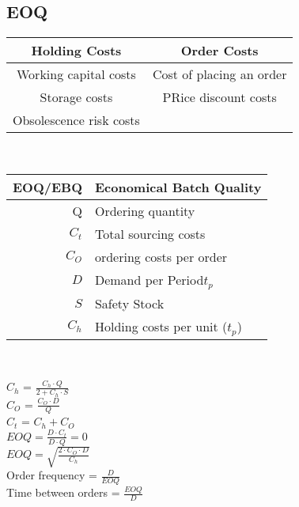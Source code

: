 \subsection{EOQ}
\begin{center}
	\begin{tabular}{|c|c|}
		\hline Holding Costs  & Order Costs \\ 
		\hline Working capital costs & Cost of placing an order \\
		Storage costs & PRice discount costs\\
		Obsolescence risk costs & \\
		\hline
	\end{tabular}
	\\\vspace{5 mm}
	\begin{tabular}{|r|l|}
		\hline EOQ/EBQ  & Economical Batch Quality \\ 
		\hline Q  & Ordering quantity \\ 
		\hline $C_t$ & Total sourcing costs \\ 
		\hline $C_O$ & ordering costs per order\\ 
		\hline $D$ & Demand per Period$t_p$\\
		\hline $S$ & Safety Stock\\
		\hline $C_h$& Holding costs per unit ($t_p$)\\
		\hline
	\end{tabular}
	\\\vspace{5 mm}
	
	$C_h$ = $\frac{C_h\cdot Q}{2 + C_h \cdot S}$\\\vspace{2mm}
	$C_O$ = $\frac{C_O \cdot D}{Q}$\\\vspace{2mm}
	$C_t$ =  $C_h + C_O$\\\vspace{2mm}
	$EOQ = \frac{D \cdot C_t}{D \cdot Q} = 0$ \\\vspace{2 mm}
	$EOQ = \sqrt{\frac{2 \cdot C_O \cdot D}{C_h}}$ \\\vspace{2 mm}
	Order frequency = $\frac{D}{EOQ}$\\\vspace{2mm}
	Time between orders = $\frac{EOQ}{D}$\\\vspace{2mm}
	
\end{center}
